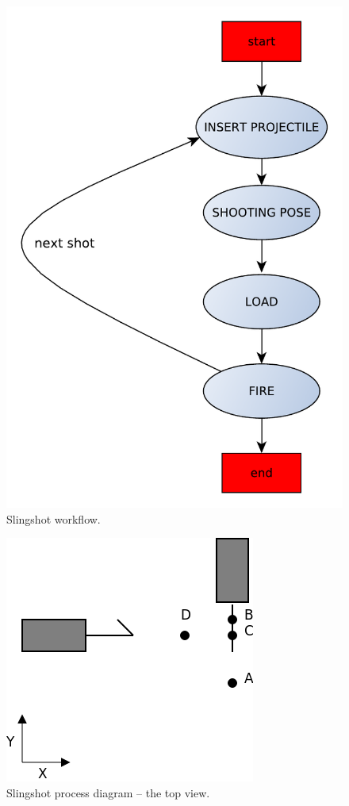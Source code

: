 			\begin{figure}
\includegraphics[height=0.5\textheight]{SlingshotStateMachine.pdf}						\centering
			\caption{Slingshot workflow.}
			\label{fig: slingshot workflow}
			\end{figure}


			\begin{figure}
			\includegraphics[width=0.25\textheight]{slingshot_process.png}			
			\centering
			\caption{Slingshot process diagram -- the top view.}
			\label{fig: slingshot process}
			\end{figure}		
			
